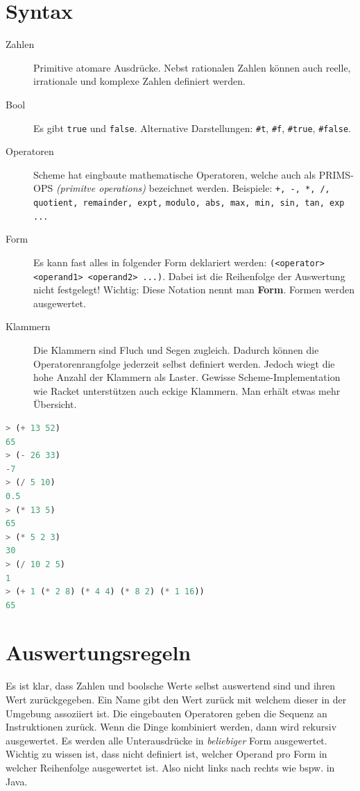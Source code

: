 \section{Syntax}
\begin{description}
	\item[Zahlen] Primitive atomare Ausdrücke. Nebst rationalen Zahlen können auch reelle, irrationale und komplexe Zahlen definiert werden.
	\item[Bool] Es gibt \verb|true| und \verb|false|. Alternative Darstellungen: \verb|#t|, \verb|#f|, \verb|#true|, \verb|#false|.
	\item[Operatoren] Scheme hat eingbaute mathematische Operatoren, welche auch als PRIMS-OPS \emph{(primitve operations)} bezeichnet werden. Beispiele: \verb|+, -, *, /, quotient, remainder, expt,| \verb|modulo, abs, max, min, sin, tan, exp ...|
	\item[Form] Es kann fast alles in folgender Form deklariert werden: \verb|(<operator> <operand1> <operand2> ...)|. Dabei ist die Reihenfolge der Auswertung nicht festgelegt! Wichtig: Diese Notation nennt man \textbf{Form}. Formen werden ausgewertet.
	\item[Klammern] Die Klammern sind Fluch und Segen zugleich. Dadurch können die Operatorenrangfolge jederzeit selbst definiert werden. Jedoch wiegt die hohe Anzahl der Klammern als Laster. Gewisse Scheme-Implementation wie Racket unterstützen auch eckige Klammern. Man erhält etwas mehr Übersicht.
\end{description}

\begin{lstlisting}[language=Lisp, caption=Simple mathematische Operationen]
> (+ 13 52)
65
> (- 26 33)
-7
> (/ 5 10)
0.5
> (* 13 5)
65
> (* 5 2 3)
30
> (/ 10 2 5)
1
> (+ 1 (* 2 8) (* 4 4) (* 8 2) (* 1 16))
65
\end{lstlisting}

\section{Auswertungsregeln}
Es ist klar, dass Zahlen und boolsche Werte selbst auswertend sind und ihren Wert zurückgegeben. Ein Name gibt den Wert zurück mit welchem dieser in der Umgebung assoziiert ist. Die eingebauten Operatoren geben die Sequenz an Instruktionen zurück.
Wenn die Dinge kombiniert werden, dann wird rekursiv ausgewertet. Es werden alle Unterausdrücke in \emph{beliebiger} Form ausgewertet. Wichtig zu wissen ist, dass nicht definiert ist, welcher Operand pro Form in welcher Reihenfolge ausgewertet ist. Also nicht links nach rechts wie bspw. in Java.


